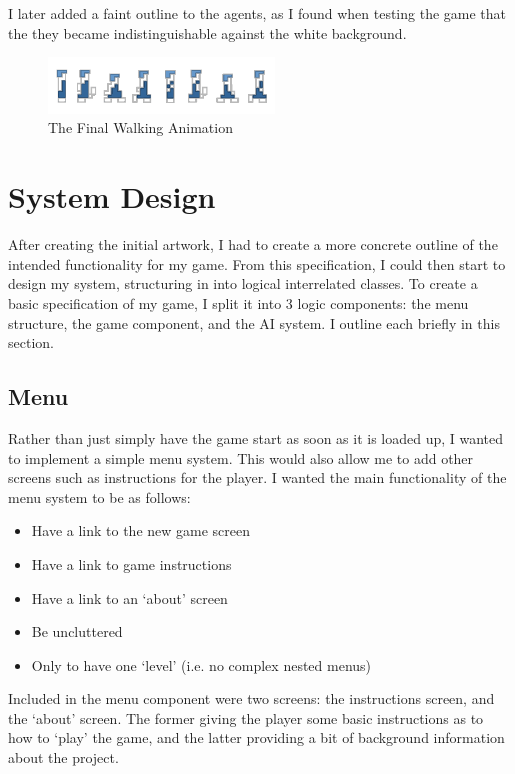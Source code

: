 \documentclass[a4paper,oneside]{report}
\begin{document}
I later added a faint outline to the agents, as I found when testing the game that the they became indistinguishable against the white background.
	
\begin{figure}[h!]
  \centering
    \includegraphics[width=60mm]{sources/images/Lemming_walk_anim}
    \caption{The Final Walking Animation}
\end{figure}
	
\chapter{System Design}

After creating the initial artwork, I had to create a more concrete outline of the intended functionality for my game. From this specification, I could then start to design my system, structuring in into logical interrelated classes. To create a basic specification of my game, I split it into 3 logic components: the menu structure, the game component, and the AI system. I outline each briefly in this section.

\section{Menu}

Rather than just simply have the game start as soon as it is loaded up, I wanted to implement a simple menu system. This would also allow me to add other screens such as instructions for the player. I wanted the main functionality of the menu system to be as follows:

\begin{itemize}
	\item Have a link to the new game screen
	\item Have a link to game instructions
	\item Have a link to an `about' screen
	\item Be uncluttered
	\item Only to have one `level' (i.e. no complex nested menus)
\end{itemize}

Included in the menu component were two screens: the instructions screen, and the `about' screen. The former giving the player some basic instructions as to how to `play' the game, and the latter providing a bit of background information about the project.
\end{document}
